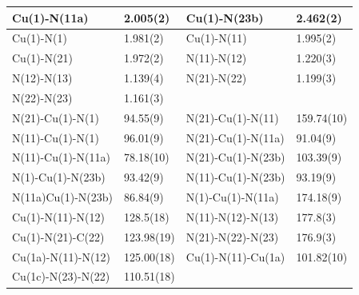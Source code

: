 \renewcommand{\arraystretch}{1.2}
\begin{table}[htpb!]
\centering
{}
\begin{tabular}{|l|l|l|l|}
\hline
Cu(1)-N(11a) & 2.005(2) & Cu(1)-N(23b) & 2.462(2)\\
\hline
Cu(1)-N(1) & 1.981(2) & Cu(1)-N(11) & 1.995(2)\\
\hline
Cu(1)-N(21) & 1.972(2) & N(11)-N(12) & 1.220(3)\\
\hline
N(12)-N(13) & 1.139(4) & N(21)-N(22) & 1.199(3)\\
\hline
N(22)-N(23) & 1.161(3) &  & \\
\hline
\hline
N(21)-Cu(1)-N(1) & 94.55(9) & N(21)-Cu(1)-N(11) & 159.74(10)\\
\hline
N(11)-Cu(1)-N(1) & 96.01(9) & N(21)-Cu(1)-N(11a) & 91.04(9)\\
\hline
N(11)-Cu(1)-N(11a) & 78.18(10) & N(21)-Cu(1)-N(23b) & 103.39(9)\\
\hline
N(1)-Cu(1)-N(23b) & 93.42(9) & N(11)-Cu(1)-N(23b) & 93.19(9)\\
\hline
N(11a)Cu(1)-N(23b) & 86.84(9) & N(1)-Cu(1)-N(11a) & 174.18(9)\\
\hline
Cu(1)-N(11)-N(12) & 128.5(18) &N(11)-N(12)-N(13) & 177.8(3)\\
\hline
Cu(1)-N(21)-C(22) & 123.98(19) & N(21)-N(22)-N(23) & 176.9(3)\\
\hline
Cu(1a)-N(11)-N(12) & 125.00(18) & Cu(1)-N(11)-Cu(1a) & 101.82(10)\\
\hline
Cu(1c)-N(23)-N(22) & 110.51(18) &  &\\
\hline

\end{tabular}
\label{batab:CuA4HOMP}
\end{table}






